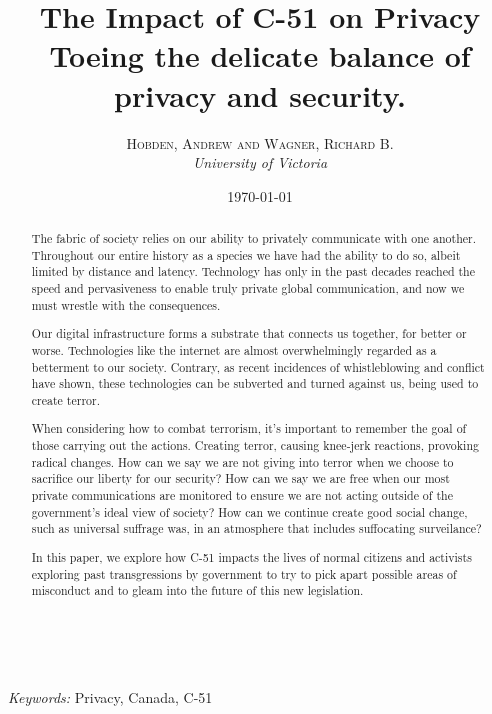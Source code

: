\documentclass[a4paper, 11pt]{article} %
\title{
    \textbf{The Impact of C-51 on Privacy}\\ %
    Toeing the delicate balance of privacy and security.
} %
\author{\textsc{Hobden, Andrew and Wagner, Richard B.} %
\\{\textit{University of Victoria}}} %
\date{\today} %
\makeatletter
\renewcommand{\maketitle}{ %
\begin{flushright} %
{\LARGE\@title} %

\vspace{50pt} %

{\large\@author} %
\\\@date %

\vspace{40pt} %
\end{flushright}
}
\makeatother
\begin{document}
\maketitle %



\begin{abstract}
The fabric of society relies on our ability to privately communicate with one another. Throughout our entire history as a species we have had the ability to do so, albeit limited by distance and latency. Technology has only in the past decades reached the speed and pervasiveness to enable truly private global communication, and now we must wrestle with the consequences.

Our digital infrastructure forms a substrate that connects us together, for better or worse. Technologies like the internet are almost overwhelmingly regarded as a betterment to our society. Contrary, as recent incidences of whistleblowing and conflict have shown, these technologies can be subverted and turned against us, being used to create terror.

When considering how to combat terrorism, it's important to remember the goal of those carrying out the actions. Creating terror, causing knee-jerk reactions, provoking radical changes. How can we say we are not giving into terror when we choose to sacrifice our liberty for our security? How can we say we are free when our most private communications are monitored to ensure we are not acting outside of the government's ideal view of society? How can we continue create good social change, such as universal suffrage was, in an atmosphere that includes suffocating surveilance?

In this paper, we explore how C-51 impacts the lives of normal citizens and activists exploring past transgressions by government to try to pick apart possible areas of misconduct and to gleam into the future of this new legislation.
\end{abstract}

\hspace*{3,6mm}\textit{Keywords:} Privacy, Canada, C-51 %

\vspace{30pt} %
\end{document}

